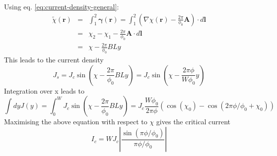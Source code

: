Using eq. \ref{eq:current-density-general}:
\begin{eqnarray}
\tilde{\chi}(\mathbf{r}) &=& \int _1^2 \mathbf{\gamma (\mathbf{r})} = \int_1^2 \left( \nabla \chi (\mathbf{r}) - \frac{2 \pi}{\phi_0} \mathbf{A} \right) \cdot d \mathbf{l}\\
 &=& \chi_2 - \chi_1 - \frac{2 \pi}{\phi_0} \mathbf{A} \cdot d \mathbf{l} \\
 &=& \chi - \frac{2 \pi}{\phi_0}B L y
\end{eqnarray}
This leads to the current density 
\begin{equation}
J_s = J_c \sin ( \chi - \frac{2 \pi}{\phi_0}B L y) = J_c \sin ( \chi - \frac{2 \pi \phi}{W \phi_0} y)
\end{equation}
Integration over x leads to
\begin{equation}
\int dy J(y) = \int_0^W J_c  \sin ( \chi - \frac{2 \pi}{\phi_0}B L y) = J_c \frac{W \phi_0}{2 \pi \phi} ( \cos (\chi_0) - \cos ( 2 \pi \phi / \phi_0 + \chi_0 ) )
\end{equation}
Maximising the above equation with respect to $\chi$ gives the critical current
\begin{equation}
I_c = W J_c \left| \frac{\sin (\pi \phi / \phi_0)}{\pi \phi / \phi_0} \right|
\end{equation}
